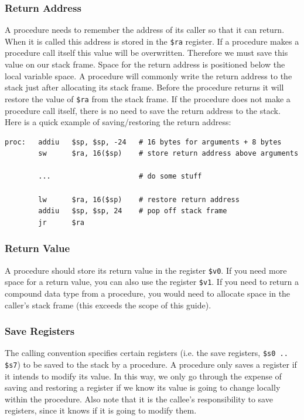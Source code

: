 \documentclass[12pt]{article}
\begin{document}
\subsubsection{Return Address}

A procedure needs to remember the address of its caller so that it can
     return. When it is called this address is stored in the \texttt{\$ra}
     register. If a procedure makes a procedure call itself this value will be
     overwritten. Therefore we must save this value on our stack frame. Space
     for the return address is positioned below the local variable space. A
     procedure will commonly write the return address to the stack just after
     allocating its stack frame. Before the procedure returns it will restore
     the value of \texttt{\$ra} from the stack frame. If the procedure does not
     make a procedure call itself, there is no need to save the return address
     to the stack.\\

Here is a quick example of saving/restoring the return address:
\begin{lstlisting}
proc:   addiu   $sp, $sp, -24   # 16 bytes for arguments + 8 bytes
        sw      $ra, 16($sp)    # store return address above arguments

        ...                     # do some stuff

        lw      $ra, 16($sp)    # restore return address
        addiu   $sp, $sp, 24    # pop off stack frame
        jr      $ra
\end{lstlisting}
\vspace{-0.25in}
\subsubsection{Return Value}

A procedure should store its return value in the register \texttt{\$v0}. If you
     need more space for a return value, you can also use the register
     \texttt{\$v1}. If you need to return a compound data type from a procedure,
     you would need to allocate space in the caller's stack frame (this exceeds
     the scope of this guide).

\newpage
\subsubsection{Save Registers}
\label{sec:saveregs}

The calling convention specifies certain registers (i.e. the save registers,
     \texttt{\$s0 .. \$s7}) to be saved to the stack by a procedure. A procedure
     only saves a register if it intends to modify its value. In this way, we
     only go through the expense of saving and restoring a register if we know
     its value is going to change locally within the procedure. Also note that
     it is the callee's responsibility to save registers, since it knows if it
     is going to modify them.\\
\end{document}

